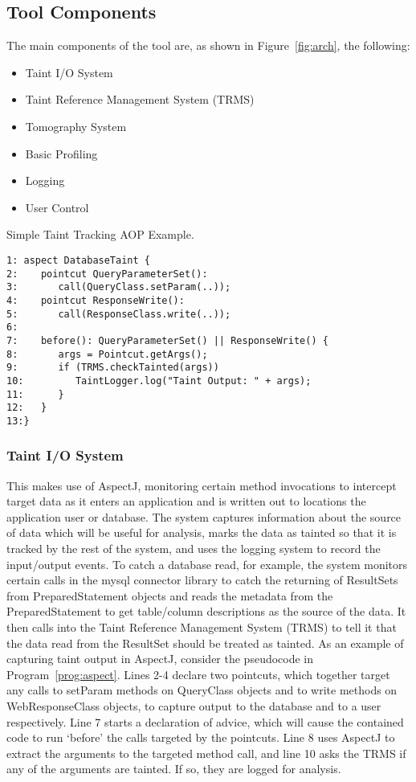 \documentclass[msc,oneside]{ubcthesis}
\begin{document}
\subsection{Tool Components}
The main components of the tool are, as shown in Figure~\ref{fig:arch}, the following:
\begin{itemize}
\item{Taint I/O System}
\item{Taint Reference Management System (TRMS)}
\item{Tomography System}
\item{Basic Profiling}
\item{Logging}
\item{User Control}
\end{itemize}

\begin{Program}
  \caption{\label{prog:aspect} Simple Taint Tracking AOP Example.}
\begin{verbatim}
1: aspect DatabaseTaint {
2:    pointcut QueryParameterSet(): 
3:       call(QueryClass.setParam(..));
4:    pointcut ResponseWrite():
5:       call(ResponseClass.write(..));
6:
7:    before(): QueryParameterSet() || ResponseWrite() {
8:       args = Pointcut.getArgs();
9:       if (TRMS.checkTainted(args))
10:         TaintLogger.log("Taint Output: " + args);
11:      }
12:   }
13:}
\end{verbatim}
\end{Program}

\subsubsection{Taint I/O System} 
This makes use of AspectJ, monitoring certain method invocations to intercept target data as it enters an application and is written out to locations the application user or database. The system captures information about the source of data which will be useful for analysis, marks the data as tainted so that it is tracked by the rest of the system, and uses the logging system to record the input/output events. To catch a database read, for example, the system monitors certain calls in the mysql connector library to catch the returning of ResultSets from PreparedStatement objects and reads the metadata from the PreparedStatement to get table/column descriptions as the source of the data. It then calls into the Taint Reference Management System (TRMS) to tell it that the data read from the ResultSet should be treated as tainted. As an example of capturing taint output in AspectJ, consider the pseudocode in Program~\ref{prog:aspect}. Lines 2-4 declare two pointcuts, which together target any calls to setParam methods on QueryClass objects and to write methods on WebResponseClass objects, to capture output to the database and to a user respectively. Line 7 starts a declaration of advice, which will cause the contained code to run `before' the calls targeted by the pointcuts. Line 8 uses AspectJ to extract the arguments to the targeted method call, and line 10 asks the TRMS if any of the arguments are tainted. If so, they are logged for analysis. \\
\end{document}
